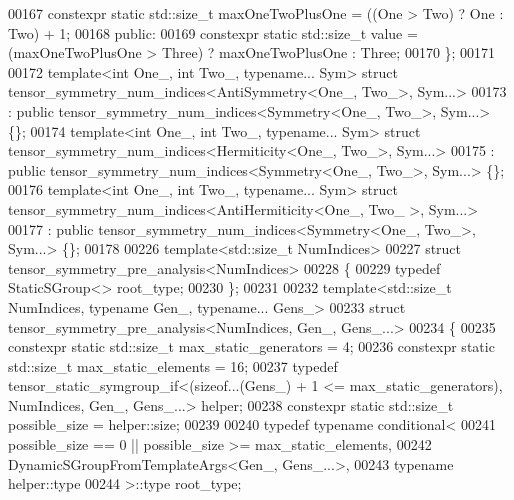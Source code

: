 \begin{DoxyCode}
00167   constexpr \textcolor{keyword}{static} std::size\_t maxOneTwoPlusOne = ((One > Two) ? One : Two) + 1;
00168 \textcolor{keyword}{public}:
00169   constexpr \textcolor{keyword}{static} std::size\_t value = (maxOneTwoPlusOne > Three) ? maxOneTwoPlusOne : Three;
00170 \};
00171 
00172 \textcolor{keyword}{template}<\textcolor{keywordtype}{int} One\_, \textcolor{keywordtype}{int} Two\_, \textcolor{keyword}{typename}... Sym> \textcolor{keyword}{struct }tensor\_symmetry\_num\_indices<AntiSymmetry<One\_, Two\_>, 
      Sym...>
00173   : \textcolor{keyword}{public} tensor\_symmetry\_num\_indices<Symmetry<One\_, Two\_>, Sym...> \{\};
00174 \textcolor{keyword}{template}<\textcolor{keywordtype}{int} One\_, \textcolor{keywordtype}{int} Two\_, \textcolor{keyword}{typename}... Sym> \textcolor{keyword}{struct }tensor\_symmetry\_num\_indices<Hermiticity<One\_, Two\_>, 
      Sym...>
00175   : \textcolor{keyword}{public} tensor\_symmetry\_num\_indices<Symmetry<One\_, Two\_>, Sym...> \{\};
00176 \textcolor{keyword}{template}<\textcolor{keywordtype}{int} One\_, \textcolor{keywordtype}{int} Two\_, \textcolor{keyword}{typename}... Sym> \textcolor{keyword}{struct }tensor\_symmetry\_num\_indices<AntiHermiticity<One\_, Two\_
      >, Sym...>
00177   : \textcolor{keyword}{public} tensor\_symmetry\_num\_indices<Symmetry<One\_, Two\_>, Sym...> \{\};
00178 
00226 \textcolor{keyword}{template}<std::\textcolor{keywordtype}{size\_t} NumIndices>
00227 \textcolor{keyword}{struct }tensor\_symmetry\_pre\_analysis<NumIndices>
00228 \{
00229   \textcolor{keyword}{typedef} StaticSGroup<> root\_type;
00230 \};
00231 
00232 \textcolor{keyword}{template}<std::size\_t NumIndices, \textcolor{keyword}{typename} Gen\_, \textcolor{keyword}{typename}... Gens\_>
00233 \textcolor{keyword}{struct }tensor\_symmetry\_pre\_analysis<NumIndices, Gen\_, Gens\_...>
00234 \{
00235   constexpr \textcolor{keyword}{static} std::size\_t max\_static\_generators = 4;
00236   constexpr \textcolor{keyword}{static} std::size\_t max\_static\_elements = 16;
00237   \textcolor{keyword}{typedef} tensor\_static\_symgroup\_if<(\textcolor{keyword}{sizeof}...(Gens\_) + 1 <= max\_static\_generators), NumIndices, Gen\_, 
      Gens\_...> helper;
00238   constexpr \textcolor{keyword}{static} std::size\_t possible\_size = helper::size;
00239 
00240   \textcolor{keyword}{typedef} \textcolor{keyword}{typename} conditional<
00241     possible\_size == 0 || possible\_size >= max\_static\_elements,
00242     DynamicSGroupFromTemplateArgs<Gen\_, Gens\_...>,
00243     \textcolor{keyword}{typename} helper::type
00244   >::type root\_type;

\end{DoxyCode}
